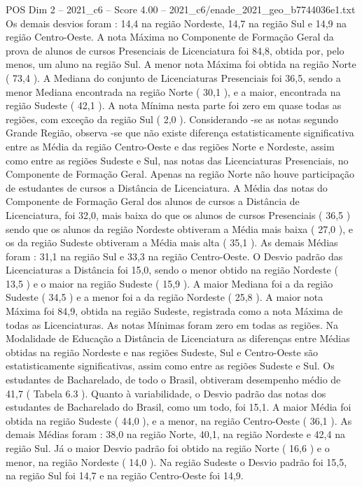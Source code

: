 \begin{textsample}{POS Dim 2 – 2021\_c6 – Score 4.00 – 2021\_c6/enade\_2021\_geo\_b7744036e1.txt}
Os demais desvios foram : 14,4 na região Nordeste, 14,7 na região Sul e 14,9 na região Centro-Oeste.
A nota Máxima no Componente de Formação Geral da prova de alunos de cursos Presenciais de Licenciatura foi 84,8, obtida por, pelo menos, um aluno na região Sul.
A menor nota Máxima foi obtida na região Norte ( 73,4 ).
A Mediana do conjunto de Licenciaturas Presenciais foi 36,5, sendo a menor Mediana encontrada na região Norte ( 30,1 ), e a maior, encontrada na região Sudeste ( 42,1 ).
A nota Mínima nesta parte foi zero em quase todas as regiões, com exceção da região Sul ( 2,0 ).
Considerando -se as notas segundo Grande Região, observa -se que não existe diferença estatisticamente significativa entre as Média da região Centro-Oeste e das regiões Norte e Nordeste, assim como entre as regiões Sudeste e Sul, nas notas das Licenciaturas Presenciais, no Componente de Formação Geral.
Apenas na região Norte não houve participação de estudantes de cursos a Distância de Licenciatura.
A Média das notas do Componente de Formação Geral dos alunos de cursos a Distância de Licenciatura, foi 32,0, mais baixa do que os alunos de cursos Presenciais ( 36,5 ) sendo que os alunos da região Nordeste obtiveram a Média mais baixa ( 27,0 ), e os da região Sudeste obtiveram a Média mais alta ( 35,1 ).
As demais Médias foram : 31,1 na região Sul e 33,3 na região Centro-Oeste.
O Desvio padrão das Licenciaturas a Distância foi 15,0, sendo o menor obtido na região Nordeste ( 13,5 ) e o maior na região Sudeste ( 15,9 ).
A maior Mediana foi a da região Sudeste ( 34,5 ) e a menor foi a da região Nordeste ( 25,8 ).
A maior nota Máxima foi 84,9, obtida na região Sudeste, registrada como a nota Máxima de todas as Licenciaturas.
As notas Mínimas foram zero em todas as regiões.
Na Modalidade de Educação a Distância de Licenciatura as diferenças entre Médias obtidas na região Nordeste e nas regiões Sudeste, Sul e Centro-Oeste são estatisticamente significativas, assim como entre as regiões Sudeste e Sul.
Os estudantes de Bacharelado, de todo o Brasil, obtiveram desempenho médio de 41,7 ( Tabela 6.3 ).
Quanto à variabilidade, o Desvio padrão das notas dos estudantes de Bacharelado do Brasil, como um todo, foi 15,1.
A maior Média foi obtida na região Sudeste ( 44,0 ), e a menor, na região Centro-Oeste ( 36,1 ).
As demais Médias foram : 38,0 na região Norte, 40,1, na região Nordeste e 42,4 na região Sul.
Já o maior Desvio padrão foi obtido na região Norte ( 16,6 ) e o menor, na região Nordeste ( 14,0 ).
Na região Sudeste o Desvio padrão foi 15,5, na região Sul foi 14,7 e na região Centro-Oeste foi 14,9.

\end{textsample}
